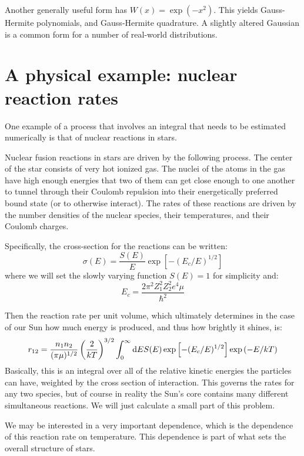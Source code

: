 Another generally useful form has $W(x) = \exp(-x^2)$. This yields
Gauss-Hermite polynomials, and Gauss-Hermite quadrature. A slightly
altered Gaussian is a common form for a number of real-world
distributions. 

\section{A physical example: nuclear reaction rates}

One example of a process that involves an integral that needs to be
estimated numerically is that of nuclear reactions in stars. 

Nuclear fusion reactions in stars are driven by the following
process. The center of the star consists of very hot ionized gas. The
nuclei of the atoms in the gas have high enough energies that two of
them can get close enough to one another to tunnel through their
Coulomb repulsion into their energetically preferred bound state (or
to otherwise interact). The rates of these reactions are driven by the
number densities of the nuclear species, their temperatures, and their
Coulomb charges. 

Specifically, the cross-section for the reactions can be written:
\begin{equation}
\sigma(E) = \frac{S(E)}{E} \exp\left[-(E_c / E)^{1/2}\right]
\end{equation}
where we will set the slowly varying function $S(E)=1$ for simplicity
and:
\begin{equation}
E_c = \frac{2\pi^2 Z_1^2 Z_2^2 e^4 \mu}{\hbar^2}
\end{equation}

Then the reaction rate per unit volume, which ultimately determines in
the case of our Sun how much energy is produced, and thus how brightly
it shines, is:
\begin{equation}
r_{12} = \frac{n_1 n_2}{(\pi \mu)^{1/2}}
\left(\frac{2}{kT}\right)^{3/2}  \int_0^\infty {\rm d}E S(E)
\exp\left[-(E_c/E)^{1/2}\right] \exp\left(-E/kT\right)
\end{equation}
Basically, this is an integral over all of the relative kinetic
energies the particles can have, weighted by the cross section of
interaction.
This governs the rates for any two species, but of course in reality
the Sun's core contains many different simultaneous reactions. We will
just calculate a small part of this problem.

We may be interested in a very important dependence, which is the
dependence of this reaction rate on temperature. This dependence is
part of what sets the overall structure of stars. 

